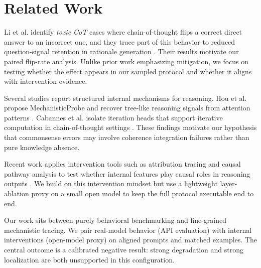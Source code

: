 \section{Related Work}
\label{sec:related}

Li et al. identify \emph{toxic CoT} cases where chain-of-thought flips a correct direct answer to an incorrect one, and they trace part of this behavior to reduced question-signal retention in rationale generation \citep{li2024focus}. Their results motivate our paired flip-rate analysis. Unlike prior work emphasizing mitigation, we focus on testing whether the effect appears in our sampled \csqa protocol and whether it aligns with intervention evidence.

Several studies report structured internal mechanisms for reasoning. Hou et al. propose MechanisticProbe and recover tree-like reasoning signals from attention patterns \citep{hou2023towards}. Cabannes et al. isolate iteration heads that support iterative computation in chain-of-thought settings \citep{cabannes2024iteration}. These findings motivate our hypothesis that commonsense errors may involve coherence integration failures rather than pure knowledge absence.

Recent work applies intervention tools such as attribution tracing and causal pathway analysis to test whether internal features play causal roles in reasoning outputs \citep{li2024focus}. We build on this intervention mindset but use a lightweight layer-ablation proxy on a small open model to keep the full protocol executable end to end.

Our work sits between purely behavioral benchmarking and fine-grained mechanistic tracing. We pair real-model behavior (API evaluation) with internal interventions (open-model proxy) on aligned prompts and matched examples. The central outcome is a calibrated negative result: strong degradation and strong localization are both unsupported in this configuration.
